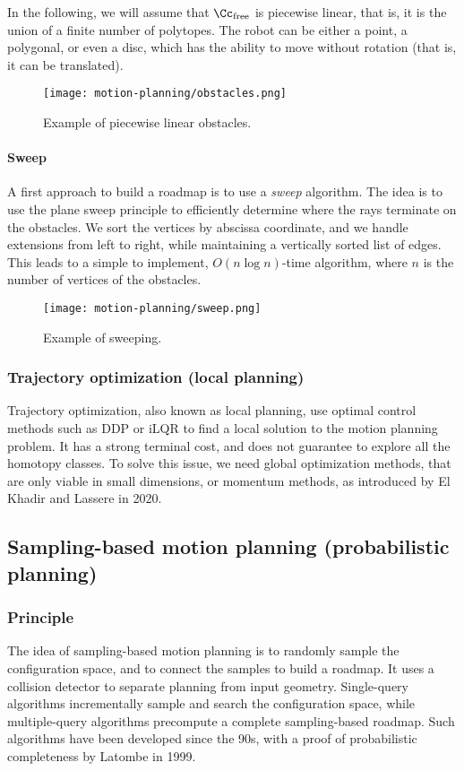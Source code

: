 In the following, we will assume that $\Cc_{\text{free}}$ is piecewise linear, that is, it is the union of a finite number of polytopes. The robot can be either a point, a polygonal, or even a disc, which has the ability to move without rotation (that is, it can be translated).
\begin{figure}[H]
    \centering
    \texttt{[image: motion-planning/obstacles.png]}
    \caption{Example of piecewise linear obstacles.}
\end{figure}

\paragraph*{Sweep}
A first approach to build a roadmap is to use a \emph{sweep} algorithm. The idea is to use the plane sweep principle to efficiently determine where the rays terminate on the obstacles. We sort the vertices by abscissa coordinate, and we handle extensions from left to right, while maintaining a vertically sorted list of edges. This leads to a simple to implement, $O(n\log n)$-time algorithm, where $n$ is the number of vertices of the obstacles.
\begin{figure}[H]
    \centering
    \texttt{[image: motion-planning/sweep.png]}
    \caption{Example of sweeping.}
\end{figure}

\subsubsection{Trajectory optimization (local planning)}
Trajectory optimization, also known as local planning, use optimal control methods such as DDP or iLQR to find a local solution to the motion planning problem. It has a strong terminal cost, and does not guarantee to explore all the homotopy classes. To solve this issue, we need global optimization methods, that are only viable in small dimensions, or momentum methods, as introduced by El Khadir and Lassere in 2020.

\subsection{Sampling-based motion planning (probabilistic planning)}
\subsubsection{Principle}
The idea of sampling-based motion planning is to randomly sample the configuration space, and to connect the samples to build a roadmap. It uses a collision detector to separate planning from input geometry. Single-query algorithms incrementally sample and search the configuration space, while multiple-query algorithms precompute a complete sampling-based roadmap. Such algorithms have been developed since the 90s, with a proof of probabilistic completeness by Latombe in 1999.


